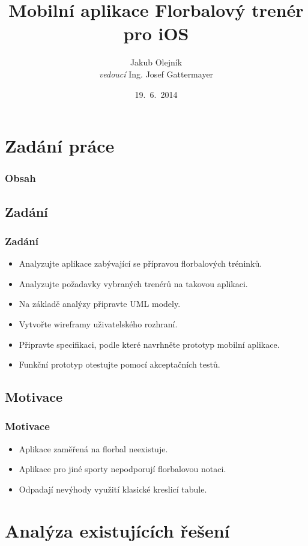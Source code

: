 \documentclass{beamer}
\title{Mobilní aplikace Florbalový trenér pro iOS}
\author{Jakub Olejník \\
\emph{vedoucí} Ing. Josef Gattermayer}
\institute[ČVUT FIT]{Katedra softwarového inženýrství\\
Fakulta informačních technologií\\
ČVUT v Praze}
\date{19.~6.~2014}
\begin{document}
\begin{frame}
  \titlepage
\end{frame}

\section{Zadání práce}

\begin{frame}
  \frametitle{Obsah}
  \tableofcontents[currentsection]
\end{frame}

\subsection{Zadání}
\begin{frame}
\frametitle{Zadání}

\begin{itemize}
  \item Analyzujte aplikace zabývající se přípravou florbalových tréninků.
  \item Analyzujte požadavky vybraných trenérů na takovou aplikaci.
  \item Na základě analýzy připravte UML modely.
  \item Vytvořte wireframy uživatelského rozhraní.
  \item Připravte specifikaci, podle které navrhněte prototyp mobilní aplikace.
  \item Funkční prototyp otestujte pomocí akceptačních testů.
\end{itemize}

\end{frame}


\subsection{Motivace}
\begin{frame}
\frametitle{Motivace}

\begin{itemize}
  \item Aplikace zaměřená na florbal neexistuje.
  \item Aplikace pro jiné sporty nepodporují florbalovou notaci.
  \item Odpadají nevýhody využití klasické kreslicí tabule.
\end{itemize}

\end{frame}

\section{Analýza existujících řešení}
\end{document}
